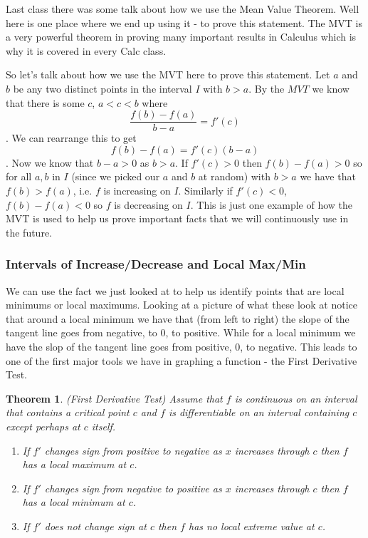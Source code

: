 \documentclass[12pt,reqno]{article}
\newtheorem{Theorem}{Theorem}
\theoremstyle{definition}
\begin{document}
Last class there was some talk about how we use the Mean Value Theorem. Well here is one place where we end up using it - to prove this statement. The MVT is a very powerful theorem in proving many important results in Calculus which is why it is covered in every Calc class. 

So let's talk about how we use the MVT here to prove this statement. Let $a$ and $b$ be any two distinct points in the interval $I$ with $b > a$. By the $MVT$ we know that there is some $c$, $a < c < b$ where $$\frac{f(b) - f(a)}{b - a} = f'(c)$$. We can rearrange this to get $$f(b) - f(a) = f'(c)(b - a)$$. Now we know that $b - a > 0$ as $b > a$. If $f'(c) > 0$ then $f(b) - f(a) > 0$ so for all $a, b$ in $I$ (since we picked our $a$ and $b$ at random) with $b > a$ we have that $f(b) > f(a)$, i.e. $f$ is increasing on $I$. Similarly if $f'(c) < 0$, $f(b) - f(a) < 0$ so $f$ is decreasing on $I$. This is just one example of how the MVT is used to help us prove important facts that we will continuously use in the future. 

\subsubsection{Intervals of Increase/Decrease and Local Max/Min}

We can use the fact we just looked at to help us identify points that are local minimums or local maximums. Looking at a picture of what these look at notice that around a local minimum we have that (from left to right) the slope of the tangent line goes from negative, to 0, to positive. While for a local minimum we have the slop of the tangent line goes from positive, 0, to negative. This leads to one of the first major tools we have in graphing a function - the First Derivative Test.
\begin{Theorem}
(First Derivative Test) Assume that $f$ is continuous on an interval that contains a critical point $c$ and $f$ is differentiable on an interval containing $c$ except perhaps at $c$ itself. 
	\begin{enumerate}
		\item[1.] If $f'$ changes sign from positive to negative as $x$ increases through $c$ then $f$ has a local maximum at $c$. 
		\item[2.] If $f'$ changes sign from negative to positive as $x$ increases through $c$ then $f$ has a local minimum at $c$. 
		\item[3.] If $f'$ does not change sign at $c$ then $f$ has no local extreme value at $c$. 
	\end{enumerate}
\end{Theorem}
\end{document}
